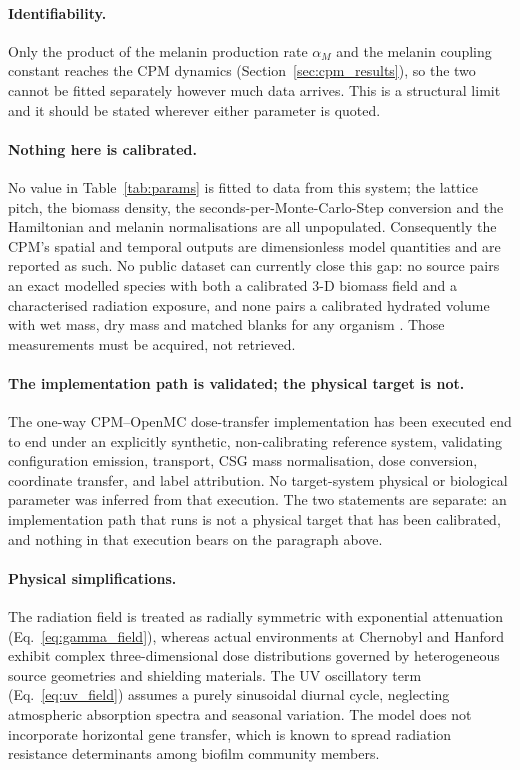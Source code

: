 \documentclass[11pt]{article}
\begin{document}
\paragraph{Identifiability.}
Only the product of the melanin production rate $\alpha_M$ and the melanin coupling constant
reaches the CPM dynamics (Section~\ref{sec:cpm_results}), so the two cannot be fitted separately
however much data arrives. This is a structural limit and it should be stated wherever either
parameter is quoted.

\paragraph{Nothing here is calibrated.}
No value in Table~\ref{tab:params} is fitted to data from this system; the lattice pitch, the
biomass density, the seconds-per-Monte-Carlo-Step conversion and the Hamiltonian and melanin
normalisations are all unpopulated. Consequently the CPM's spatial and temporal outputs are
dimensionless model quantities and are reported as such. No public dataset can currently close this
gap: no source pairs an exact modelled species with both a calibrated 3-D biomass field and a
characterised radiation exposure, and none pairs a calibrated hydrated volume with wet mass, dry
mass and matched blanks for any organism \cite{audit2026}. Those measurements must be acquired, not
retrieved.

\paragraph{The implementation path is validated; the physical target is not.}
The one-way CPM--OpenMC dose-transfer implementation has been executed end to end under an
explicitly synthetic, non-calibrating reference system, validating configuration emission,
transport, CSG mass normalisation, dose conversion, coordinate transfer, and label
attribution. No target-system physical or biological parameter was inferred from that
execution. The two statements are separate: an implementation path that runs is not a
physical target that has been calibrated, and nothing in that execution bears on the
paragraph above.

\paragraph{Physical simplifications.}
The radiation field is treated as radially symmetric with exponential attenuation
(Eq.~\ref{eq:gamma_field}), whereas actual environments at Chernobyl and Hanford exhibit complex
three-dimensional dose distributions governed by heterogeneous source geometries and shielding
materials. The UV oscillatory term (Eq.~\ref{eq:uv_field}) assumes a purely sinusoidal diurnal
cycle, neglecting atmospheric absorption spectra and seasonal variation. The model does not
incorporate horizontal gene transfer, which is known to spread radiation resistance determinants
among biofilm community members.
\end{document}
